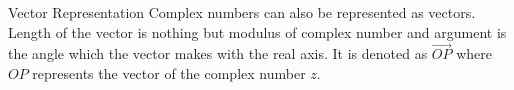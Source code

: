 \documentclass[aspectratio=169,8pt]{beamer}
\begin{document}
\begin{frame}{Vector Representation}
  Complex numbers can also be represented as vectors. Length of the vector is
  nothing but modulus of complex number and argument is the angle which the
  vector makes with the real axis. It is denoted as $\overrightarrow{OP}$ where
  $OP$ represents the vector of the complex number $z.$
\end{frame}
\end{document}
